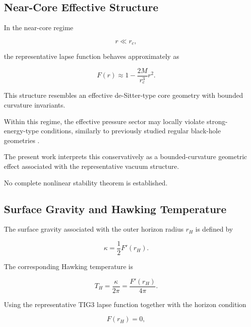 \subsection{Near-Core Effective Structure}

In the near-core regime

\begin{equation}
r \ll r_c,
\end{equation}

the representative lapse function behaves approximately as

\begin{equation}
F(r)
\approx
1
-
\frac{2M}{r_c^3}r^2.
\end{equation}

This structure resembles an effective de-Sitter-type core geometry with bounded curvature invariants.

Within this regime, the effective pressure sector may locally violate strong-energy-type conditions, similarly to previously studied regular black-hole geometries
\cite{bardeen1968,hayward2006,dymnikova1992,ansoldi2008}.

The present work interprets this conservatively as a bounded-curvature geometric effect associated with the representative vacuum structure.

No complete nonlinear stability theorem is established.


\subsection{Surface Gravity and Hawking Temperature}

The surface gravity associated with the outer horizon radius $r_H$ is defined by

\begin{equation}
\kappa
=
\frac{1}{2}
F'(r_H).
\end{equation}

The corresponding Hawking temperature is

\begin{equation}
T_H
=
\frac{\kappa}{2\pi}
=
\frac{F'(r_H)}{4\pi}.
\label{eq:hawkingtemp}
\end{equation}

Using the representative TIG3 lapse function together with the horizon condition

\begin{equation}
F(r_H)=0,
\end{equation}

